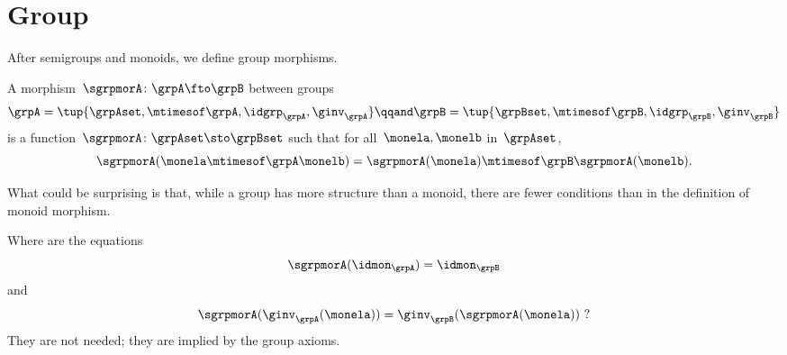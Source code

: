 \section{Group \whomos}

After semigroups and monoids, we define group morphisms.


\begin{ctdefinition}
    \label{def:group-mor}
    A morphism~$\sgrpmorA\colon \grpA \fto \grpB$ between groups
    \begin{equation}
        \grpA = \tup{\grpAset, \mtimesof\grpA, \idgrp_\grpA, \ginv_\grpA}
        \qqand
        \grpB = \tup{\grpBset, \mtimesof\grpB, \idgrp_\grpB,  \ginv_\grpB}
    \end{equation}
    is a function~$\sgrpmorA \colon \grpAset \sto \grpBset$ such that for all~$\monela, \monelb$ in~$\grpAset$,
    \begin{equation}
        \label{eq:group-mor-comp}
        \sgrpmorA (\monela \mtimesof\grpA \monelb) = \sgrpmorA (\monela) \mtimesof\grpB  \sgrpmorA(\monelb).
    \end{equation}
\end{ctdefinition}

What could be surprising is that, while a group has more structure than a monoid, there are fewer conditions than in the definition of monoid morphism.

Where are the equations
\begin{equation}
    \label{eq:grp-id-comp}
    \sgrpmorA (\idmon_\grpA) = \idmon_{\grpB}
\end{equation}
and
\begin{equation}
    \label{eq:grp-inv-comp}
    \sgrpmorA (\ginv_\grpA(\monela)) = \ginv_\grpB(\sgrpmorA(\monela)) \ ?
\end{equation}
%
They are not needed; they are implied by the group axioms.

